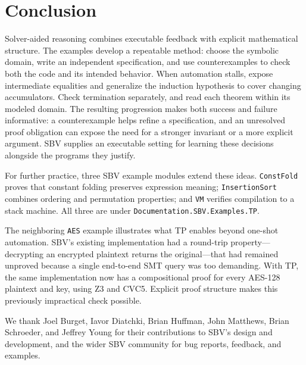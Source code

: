 \documentclass[review]{jfp-epi}
\newcommand{\code}[1]{\texttt{#1}}
\begin{document}
\section{Conclusion}

Solver-aided reasoning combines executable feedback with explicit mathematical
structure. The examples develop a repeatable method: choose the symbolic domain, write an
independent specification, and use counterexamples to check both the code and
its intended behavior. When automation stalls, expose intermediate equalities
and generalize the induction hypothesis to cover changing accumulators.
Check termination separately, and read each theorem within its modeled domain.
The resulting progression makes both success and failure informative: a
counterexample helps refine a specification, and an unresolved proof obligation
can expose the need for a stronger invariant or a more explicit argument.
SBV supplies an executable setting for learning these decisions alongside the
programs they justify.

For further practice, three SBV example modules extend these ideas.
\code{ConstFold} proves that constant folding preserves expression meaning;
\code{InsertionSort} combines ordering and permutation properties; and
\code{VM} verifies compilation to a stack machine. All three are under
\code{Documentation.\allowbreak SBV.\allowbreak Examples.\allowbreak TP}.

The neighboring \code{AES} example illustrates what TP enables beyond one-shot
automation. SBV's existing implementation had a round-trip property---decrypting
an encrypted plaintext returns the original---that had remained unproved because
a single end-to-end SMT query was too demanding. With TP, the same implementation
now has a compositional proof for every AES-128 plaintext and key, using Z3 and
CVC5. Explicit proof structure makes this previously impractical check possible.

\begin{acks}
We thank Joel Burget, Iavor Diatchki, Brian Huffman, John Matthews, Brian Schroeder,
and Jeffrey Young for their contributions to SBV's design and development, and
the wider SBV community for bug reports, feedback, and examples.
\end{acks}



\end{document}
